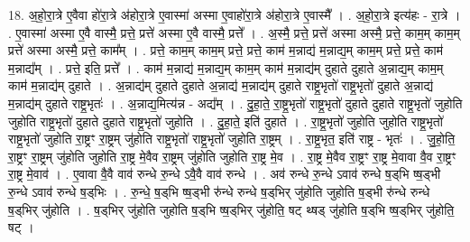 \documentclass[17pt]{extarticle}
\begin{document}
18. अ॒हो॒रा॒त्रे ए॒वैवा हो॑रा॒त्रे अ॑होरा॒त्रे ए॒वास्मा॑ अस्मा ए॒वाहो॑रा॒त्रे अ॑होरा॒त्रे ए॒वास्मै᳚ । . अ॒हो॒रा॒त्रे इत्य॑हः - रा॒त्रे । . ए॒वास्मा॑ अस्मा ए॒वै वास्मै॒ प्रत्ते॒ प्रत्ते॑ अस्मा ए॒वै वास्मै॒ प्रत्ते᳚ । . अ॒स्मै॒ प्रत्ते॒ प्रत्ते॑ अस्मा अस्मै॒ प्रत्ते॒ काम॒म् काम॒म् प्रत्ते॑ अस्मा अस्मै॒ प्रत्ते॒ काम᳚म् । . प्रत्ते॒ काम॒म् काम॒म् प्रत्ते॒ प्रत्ते॒ काम॑ म॒न्नाद्य॑ म॒न्नाद्य॒म् काम॒म् प्रत्ते॒ प्रत्ते॒ काम॑ म॒न्नाद्य᳚म् । . प्रत्ते॒ इति॒ प्रत्ते᳚ । . काम॑ म॒न्नाद्य॑ म॒न्नाद्य॒म् काम॒म् काम॑ म॒न्नाद्य॑म् दुहाते दुहाते अ॒न्नाद्य॒म् काम॒म् काम॑ म॒न्नाद्य॑म् दुहाते । . अ॒न्नाद्य॑म् दुहाते दुहाते अ॒न्नाद्य॑ म॒न्नाद्य॑म् दुहाते राष्ट्र॒भृतो॑ राष्ट्र॒भृतो॑ दुहाते अ॒न्नाद्य॑ म॒न्नाद्य॑म् दुहाते राष्ट्र॒भृतः॑ । . अ॒न्नाद्य॒मित्य॑न्न - अद्य᳚म् । . दु॒हा॒ते॒ रा॒ष्ट्र॒भृतो॑ राष्ट्र॒भृतो॑ दुहाते दुहाते राष्ट्र॒भृतो॑ जुहोति जुहोति राष्ट्र॒भृतो॑ दुहाते दुहाते राष्ट्र॒भृतो॑ जुहोति । . दु॒हा॒ते॒ इति॑ दुहाते । . रा॒ष्ट्र॒भृतो॑ जुहोति जुहोति राष्ट्र॒भृतो॑ राष्ट्र॒भृतो॑ जुहोति रा॒ष्ट्रꣳ रा॒ष्ट्रम् जु॑होति राष्ट्र॒भृतो॑ राष्ट्र॒भृतो॑ जुहोति रा॒ष्ट्रम् । . रा॒ष्ट्र॒भृत॒ इति॑ राष्ट्र - भृतः॑ । . जु॒हो॒ति॒ रा॒ष्ट्रꣳ रा॒ष्ट्रम् जु॑होति जुहोति रा॒ष्ट्र मे॒वैव रा॒ष्ट्रम् जु॑होति जुहोति रा॒ष्ट्र मे॒व । . रा॒ष्ट्र मे॒वैव रा॒ष्ट्रꣳ रा॒ष्ट्र मे॒वावा वै॒व रा॒ष्ट्रꣳ रा॒ष्ट्र मे॒वाव॑ । . ए॒वावा वै॒वै वाव॑ रुन्धे रु॒न्धे ऽवै॒वै वाव॑ रुन्धे । . अव॑ रुन्धे रु॒न्धे ऽवाव॑ रुन्धे ष॒ड्‌भि ष्ष॒ड्भी रु॒न्धे ऽवाव॑ रुन्धे ष॒ड्‌भिः । . रु॒न्धे॒ ष॒ड्‌भि ष्ष॒ड्भी रु॑न्धे रुन्धे ष॒ड्‌भिर् जु॑होति जुहोति ष॒ड्भी रु॑न्धे रुन्धे ष॒ड्‌भिर् जु॑होति । . ष॒ड्‌भिर् जु॑होति जुहोति ष॒ड्‌भि ष्ष॒ड्‌भिर् जु॑होति॒ षट् थ्षड् जु॑होति ष॒ड्‌भि ष्ष॒ड्‌भिर् जु॑होति॒ षट् । \newline
\end{document}
